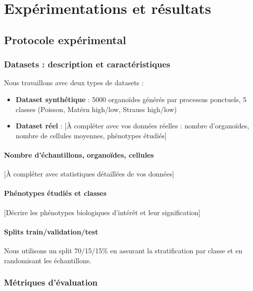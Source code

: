 
\chapter{Expérimentations et résultats}

\section{Protocole expérimental}

\subsection{Datasets : description et caractéristiques}

Nous travaillons avec deux types de datasets :
\begin{itemize}
    \item \textbf{Dataset synthétique} : 5000 organoïdes générés par processus ponctuels, 5 classes (Poisson, Matérn high/low, Strauss high/low)
    \item \textbf{Dataset réel} : [À compléter avec vos données réelles : nombre d'organoïdes, nombre de cellules moyennes, phénotypes étudiés]
\end{itemize}

\subsubsection{Nombre d'échantillons, organoïdes, cellules}
[À compléter avec statistiques détaillées de vos données]

\subsubsection{Phénotypes étudiés et classes}
[Décrire les phénotypes biologiques d'intérêt et leur signification]

\subsubsection{Splits train/validation/test}
Nous utilisons un split 70/15/15\% en assurant la stratification par classe et en randomisant les échantillons.

\subsection{Métriques d'évaluation}

